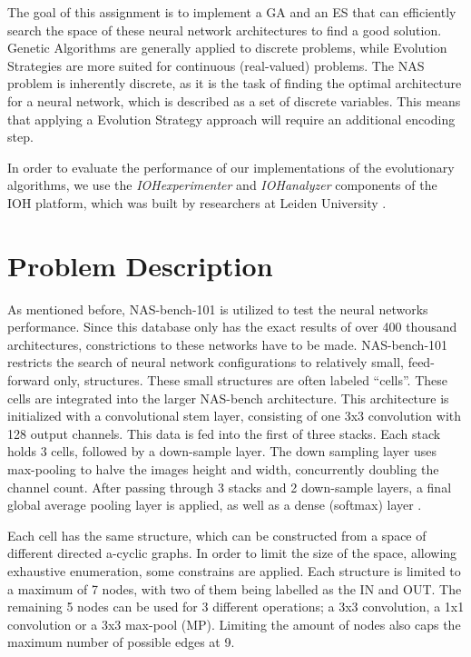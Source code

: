 \documentclass{article}
\begin{document}
The goal of this assignment is to implement a GA and an ES that can efficiently search the space of these neural network architectures to find a good solution.
Genetic Algorithms are generally applied to discrete problems, while Evolution Strategies are more suited for continuous (real-valued) problems.
The NAS problem is inherently discrete, as it is the task of finding the optimal architecture for a neural network, which is described as a set of discrete variables.
This means that applying a Evolution Strategy approach will require an additional encoding step.

In order to evaluate the performance of our implementations of the evolutionary algorithms, we use the \textit{IOHexperimenter} and \textit{IOHanalyzer} components of the IOH platform, which was built by researchers at Leiden University \cite{IOH}.



\section{Problem Description}
\label{sec:problem}

As mentioned before, NAS-bench-101 is utilized to test the neural networks performance.
Since this database only has the exact results of over 400 thousand architectures, constrictions to these networks have to be made.
NAS-bench-101 restricts the search of neural network configurations to relatively small, feed-forward only, structures.
These small structures are often labeled ``cells''.
These cells are integrated into the larger NAS-bench architecture.
This architecture is initialized with a convolutional stem layer, consisting of one 3x3 convolution with 128 output channels.
This data is fed into the first of three stacks.
Each stack holds 3 cells, followed by a down-sample layer.
The down sampling layer uses max-pooling to halve the images height and width, concurrently doubling the channel count.
After passing through 3 stacks and 2 down-sample layers, a final global average pooling layer is applied, as well as a dense (softmax) layer \cite{NAS}.

Each cell has the same structure, which can be constructed from a space of different directed a-cyclic graphs.
In order to limit the size of the space, allowing exhaustive enumeration, some constrains are applied.
Each structure is limited to a maximum of 7 nodes, with two of them being labelled as the IN and OUT.
The remaining 5 nodes can be used for 3 different operations; a 3x3 convolution, a 1x1 convolution or a 3x3 max-pool (MP).
Limiting the amount of nodes also caps the maximum number of possible edges at 9.
\end{document}
